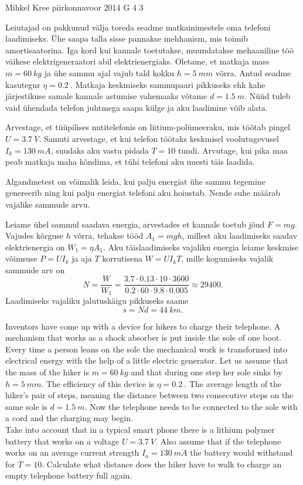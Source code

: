 {Mihkel Kree} %
{piirkonnavoor} %
{2014} %
{G 4} %
{3} %
{
\ifStatement
Leiutajad on pakkunud välja toreda seadme matkainimestele oma telefoni laadimiseks. Ühe saapa talla sisse pannakse mehhanism, mis toimib amortisaatorina. Iga kord kui  kannale toetutakse, muundatakse  mehaaniline töö väikese elektrigeneraatori abil elektrienergiaks. Oletame, et matkaja mass $m=\SI{60}{kg}$ ja ühe sammu ajal vajub tald kokku 
$h=\SI{5}{mm}$ võrra. Antud seadme kasutegur $\eta = \SI{0,2}{}$. Matkaja keskmiseks sammupaari pikkuseks ehk kahe järjestikuse samale kannale astumise vahemaaks võtame $d=\SI{1.5}{m}$. Nüüd tuleb vaid ühendada telefon juhtmega saapa külge ja aku laadimine võib alata.

Arvestage, et tüüpilises nutitelefonis on liitium-polümeeraku, mis töötab pingel $U=\SI{3.7}{V}$. Samuti arvestage, et kui telefon töötaks keskmisel voolutugevusel $I_k=\SI{130}{mA}$, suudaks aku vastu pidada $T=10$ tundi. Arvutage, kui pika maa peab matkaja maha kõndima, et tühi telefoni aku uuesti täis laadida.
\fi


\ifHint
Algandmetest on võimalik leida, kui palju energiat ühe sammu tegemine genereerib ning kui palju energiat telefoni aku hoiustab. Nende suhe määrab vajalike sammude arvu.
\fi


\ifSolution
Leiame ühel sammul saadava energia, arvestades et kannale toetub jõud $F=mg$. Vajudes kõrguse $h$ võrra, tehakse tööd $A_1 = mgh$, millest aku laadimiseks saadav elektrienergia on $W_1=\eta A_1$. 
Aku täislaadimiseks vajaliku energia leiame keskmise võimsuse $P=UI_k$ ja aja $T$ korrutisena $W=UI_kT$, mille kogumiseks vajalik sammude arv on
\[N = \frac{W}{W_1} = \frac{3.7 \cdot 0.13 \cdot 10 \cdot 3600 }{0.2 \cdot 60\cdot 9.8 \cdot 0.005}\approx29400.\]
Laadimiseks vajaliku jalutuskäigu pikkuseks saame
\[s=Nd = \SI{44}{km}.\]
\fi


\ifEngStatement
Inventors have come up with a device for hikers to charge their telephone. A mechanism that works as a shock absorber is put inside the sole of one boot. Every time a person leans on the sole the mechanical work is transformed into electrical energy with the help of a little electric generator. Let us assume that the mass of the hiker is $m=\SI{60}{kg}$ and that during one step her sole sinks by $h=\SI{5}{mm}$. The efficiency of this device is $\eta = \SI{0,2}{}$. The average length of the hiker’s pair of steps, meaning the distance between two consecutive steps on the same sole is $d=\SI{1.5}{m}$. Now the telephone needs to be connected to the sole with a cord and the charging may begin.\\
Take into account that in a typical smart phone there is a lithium polymer battery that works on a voltage $U=\SI{3.7}{V}$. Also assume that if the telephone works on an average current strength $I_a=\SI{130}{mA}$ the battery would withstand for $T=10$. Calculate what distance does the hiker have to walk to charge an empty telephone battery full again.
\fi


}
